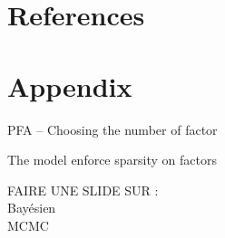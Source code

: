 \documentclass[10pt,xcolor=x11names,compress, notes=show]{beamer}%
\begin{document}
\section*{References}
\begin{frame}{\insertsectionhead}
		\setlength{\bibsep}{2em}
		
		
\end{frame}

\section*{Appendix}
\begin{frame}{PFA -- Choosing the number of factor}
	\centering
	
	The model enforce sparsity on factors\\
	
	

\end{frame}

\begin{frame}
	FAIRE UNE SLIDE SUR : \\
	Bayésien\\
	MCMC
\end{frame}

\setcounter{framenumber}{\value{finalframe}}




% 
% 
\end{document}
